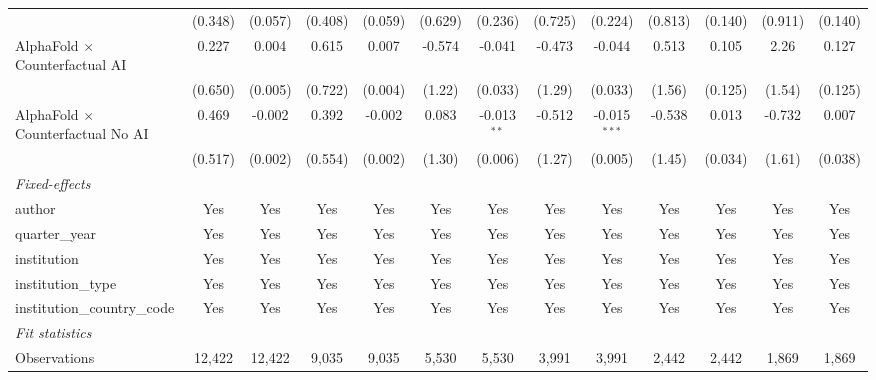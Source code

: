 \begin{tabular}{lcccccccccccc}
                                            & (0.348) & (0.057)       & (0.408) & (0.059)       & (0.629)    & (0.236)       & (0.725)     & (0.224)        & (0.813) & (0.140) & (0.911) & (0.140)\\   
   AlphaFold $\times$ Counterfactual AI     & 0.227   & 0.004         & 0.615   & 0.007         & -0.574     & -0.041        & -0.473      & -0.044         & 0.513   & 0.105   & 2.26    & 0.127\\   
                                            & (0.650) & (0.005)       & (0.722) & (0.004)       & (1.22)     & (0.033)       & (1.29)      & (0.033)        & (1.56)  & (0.125) & (1.54)  & (0.125)\\   
   AlphaFold $\times$ Counterfactual No AI  & 0.469   & -0.002        & 0.392   & -0.002        & 0.083      & -0.013$^{**}$ & -0.512      & -0.015$^{***}$ & -0.538  & 0.013   & -0.732  & 0.007\\   
                                            & (0.517) & (0.002)       & (0.554) & (0.002)       & (1.30)     & (0.006)       & (1.27)      & (0.005)        & (1.45)  & (0.034) & (1.61)  & (0.038)\\   
   \midrule
   \emph{Fixed-effects}\\
   author                                   & Yes     & Yes           & Yes     & Yes           & Yes        & Yes           & Yes         & Yes            & Yes     & Yes     & Yes     & Yes\\  
   quarter\_year                            & Yes     & Yes           & Yes     & Yes           & Yes        & Yes           & Yes         & Yes            & Yes     & Yes     & Yes     & Yes\\  
   institution                              & Yes     & Yes           & Yes     & Yes           & Yes        & Yes           & Yes         & Yes            & Yes     & Yes     & Yes     & Yes\\  
   institution\_type                        & Yes     & Yes           & Yes     & Yes           & Yes        & Yes           & Yes         & Yes            & Yes     & Yes     & Yes     & Yes\\  
   institution\_country\_code               & Yes     & Yes           & Yes     & Yes           & Yes        & Yes           & Yes         & Yes            & Yes     & Yes     & Yes     & Yes\\  
   \midrule
   \emph{Fit statistics}\\
   Observations                             & 12,422  & 12,422        & 9,035   & 9,035         & 5,530      & 5,530         & 3,991       & 3,991          & 2,442   & 2,442   & 1,869   & 1,869\\  

\end{tabular}
